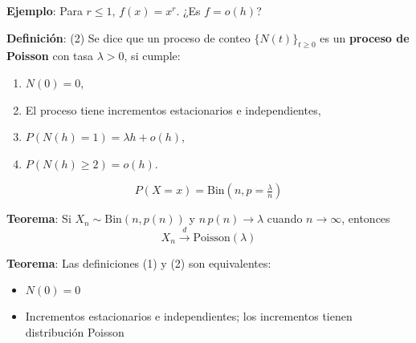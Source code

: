 \documentclass[12pt,a4paper]{article}
\newcommand{\definicion}[1]{%
\begin{definicionbox}
\textbf{Definición}: #1
\end{definicionbox}
}
\newcommand{\teorema}[1]{%
\begin{teoremabox}
\textbf{Teorema}: #1
\end{teoremabox}
}
\begin{document}
\textbf{Ejemplo}: Para $r \leq 1$, $f(x) = x^r$.  
¿Es $f = o(h)$?

\definicion{(2) Se dice que un proceso de conteo $\{N(t)\}_{t \geq 0}$ es un \textbf{proceso de Poisson} con tasa $\lambda > 0$, si cumple:
\begin{enumerate}
    \item $N(0) = 0$,
    \item El proceso tiene incrementos estacionarios e independientes,
    \item $P(N(h) = 1) = \lambda h + o(h)$,
    \item $P(N(h) \geq 2) = o(h)$.
\end{enumerate}}


\begin{center}
\end{center}

\begin{equation*}
P(X = x) = \text{Bin}(n, p = \tfrac{\lambda}{n})
\end{equation*}

\teorema{Si $X_n \sim \text{Bin}(n, p(n))$ y $n \, p(n) \to \lambda$ cuando $n \to \infty$, entonces
\begin{equation*}
X_n \xrightarrow{d} \text{Poisson}(\lambda)
\end{equation*}}

\teorema{Las definiciones (1) y (2) son equivalentes:
\begin{itemize}
    \item $N(0) = 0$
    \item Incrementos estacionarios e independientes; los incrementos tienen distribución Poisson
\end{itemize}}
\end{document}
